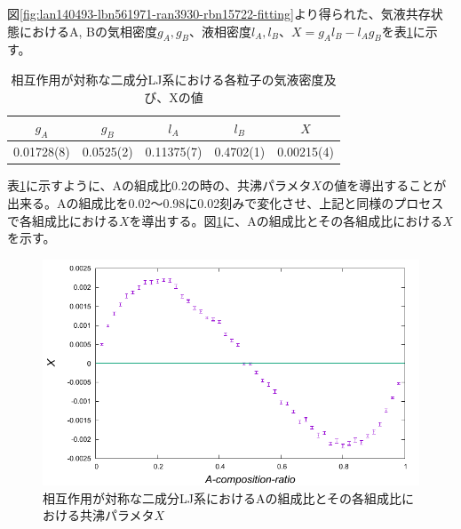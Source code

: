 \documentclass[titlepage]{jsreport}
\begin{document}
\newpage

図\ref{fig:lan140493-lbn561971-ran3930-rbn15722-fitting}より得られた、気液共存状態におけるA, Bの気相密度$g_A, g_B$、液相密度$l_A, l_B$、$X=g_Al_B-l_Ag_B$を表\ref{table:lan140493-lbn561971-ran3930-rbn15722-fitting}に示す。

\begin{table}[htbp]
    \begin{center}
        \caption{相互作用が対称な二成分LJ系における各粒子の気液密度及び、Xの値}
        \label{table:lan140493-lbn561971-ran3930-rbn15722-fitting}
        \begin{tabular}{c c c c c}
            $g_A$ & $g_B$ & $l_A$ & $l_B$ & $X$ \\
            \hline
            0.01728(8)& 0.0525(2) & 0.11375(7) & 0.4702(1) & 0.00215(4) \\
        \end{tabular}
    \end{center}
\end{table}

表\ref{table:lan140493-lbn561971-ran3930-rbn15722-fitting}に示すように、Aの組成比0.2の時の、共沸パラメタ$X$の値を導出することが出来る。Aの組成比を0.02〜0.98に0.02刻みで変化させ、上記と同様のプロセスで各組成比における$X$を導出する。図\ref{fig:bi-symmetric}に、Aの組成比とその各組成比における$X$を示す。

\begin{figure}[htbp]
    \begin{center}
        \includegraphics[width=14cm]{fig/bi-symmetric/L100T1.0.pdf}
    \end{center}
    \caption{相互作用が対称な二成分LJ系におけるAの組成比とその各組成比における共沸パラメタ$X$}
    \label{fig:bi-symmetric}
\end{figure}
\end{document}
